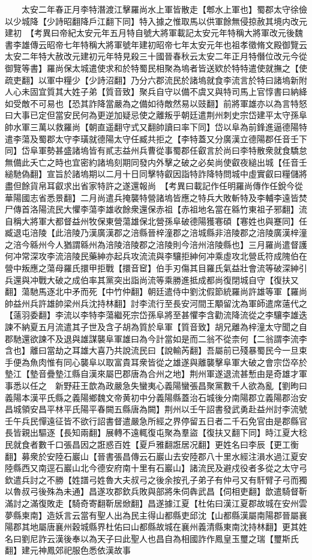 　　太安二年春正月李特潛渡江擊羅尚水上軍皆散走【郫水上軍也】蜀郡太守徐儉以少城降【少詩昭翻降戶江翻下同】特入據之惟取馬以供軍餘無侵掠赦其境内改元建初　【考異曰帝紀太安元年五月特自號大將軍載記太安元年特稱大將軍改元後魏書李雄傳云昭帝七年特稱大將軍號年建初昭帝七年太安元年也祖孝徵脩文殿御覽云太安二年特大赦改元建初元年特見殺三十國晉春秋云太安二年正月特僭位改元今從御覽等書】羅尚保太城遣使求和於特蜀民相聚為塢者皆送欵於特特遣使就撫之【使疏吏翻】以軍中糧少【少詩沼翻】乃分六郡流民於諸塢就食李流言於特曰諸塢新附人心未固宜質其大姓子弟【質音致】聚兵自守以備不虞又與特司馬上官惇書曰納絳如受敵不可易也【恐其詐降當嚴為之備如待敵然易以豉翻】前將軍雄亦以為言特怒曰大事已定但當安民何為更逆加疑忌使之離叛乎朝廷遣荆州刺史宗岱建平太守孫阜帥水軍三萬以救羅尚【朝直遥翻守式又翻帥讀曰率下同】岱以阜為前鋒進逼德陽特遣李蕩及蜀郡太守李璜就德陽太守任臧共拒之【李特蓋又分廣漢立德陽郡任音壬下同】岱阜軍勢甚盛諸塢皆有貳志益州兵曹從事蜀郡任叡言於尚曰李特散衆就食驕怠無備此夭亡之時也宜密約諸塢刻期同發内外擊之破之必矣尚使叡夜縋出城【任音壬縋馳偽翻】宣旨於諸塢期以二月十日同擊特叡因詣特詐降特問城中虛實叡曰糧儲將盡但餘貨帛耳叡求出省家特許之遂還報尚　【考異曰載記作任明羅尚傳作任銳今從華陽國志省悉景翻】二月尚遣兵掩襲特營諸塢皆應之特兵大敗斬特及李輔李遠皆焚尸傳首洛陽流民大懼李蕩李雄收餘衆還保赤祖【赤祖地名當在緜竹東祖子邪翻】流自稱大將軍大都督益州牧保東營蕩雄保北營孫阜破德陽獲寋碩【寋姓也與蹇同】任臧退屯涪陵【此涪陵乃漢廣漢郡之涪縣晉梓潼郡之涪城縣非涪陵郡之涪陵廣漢梓潼之涪今緜州今人猶謂緜州為涪陵涪陵郡之涪陵則今涪州涪陵縣也】三月羅尚遣督護何冲常深攻李流涪陵民藥紳亦起兵攻流流與李驤拒紳何冲乘虛攻北營氐符成隗伯在營中叛應之蕩母羅氏擐甲拒戰【擐音䆠】伯手刃傷其目羅氏氣益壯會流等破深紳引兵還與冲戰大破之成伯率其黨突出詣尚流等乘勝進抵成都尚復閉城自守【復扶又翻】蕩馳馬逐北中矛而死【中竹仲翻】朝廷遣侍中劉沈假節統羅尚許雄等軍【羅尚帥益州兵許雄帥梁州兵沈持林翻】討李流行至長安河間王顒留沈為軍師遣席薳代之【薳羽委翻】李流以李特李蕩繼死宗岱孫阜將至甚懼李含勸流降流從之李驤李雄迭諫不納夏五月流遣其子世及含子胡為質於阜軍【質音致】胡兄離為梓潼太守聞之自郡馳還欲諫不及退與雄謀襲阜軍雄曰為今計當如是而二翁不從柰何【二翁謂李流李含也】離曰當劫之耳雄大喜乃共說流民曰【說輸芮翻】吾屬前已殘暴蜀民今一旦束手便為魚肉惟有同心襲阜以取富貴耳衆皆從之雄遂與離襲擊阜軍大破之會宗岱卒於墊江【墊音疊墊江縣自漢來屬巴郡唐為合州之地】荆州軍遂退流甚慙由是奇雄才軍事悉以任之　新野莊王歆為政嚴急失蠻夷心義陽蠻張昌聚黨數千人欲為亂【劉昫曰義陽本漢平氏縣之義陽鄉魏文帝黄初中分義陽縣蓋治石城後分南陽郡立義陽郡治安昌城領安昌平林平氏陽平春闕五縣唐為闕】荆州以壬午詔書發武勇赴益州討李流號壬午兵民憚遠征皆不欲行詔書督遣嚴急所經之界停留五日者二千石免官由是郡縣官長皆親出驅逐【長知兩翻】展轉不遠輒復屯聚為羣盜【復扶又翻下同】時江夏大稔民就食者數千口張昌因之誑惑百姓【夏戶雅翻誑居况翻】更姓名曰李辰【更工衡翻】募衆於安陸石巖山【晉書張昌傳云石巖山去安陸郡八十里水經注溳水過江夏安陸縣西又南逕石巖山北今德安府南十里有石巖山】諸流民及避戍役者多從之太守弓欽遣兵討之不勝【姓譜弓姓魯大夫叔弓之後余按孔子弟子有仲弓又有馯臂子弓而獨以魯叔弓後殊為未通】昌遂攻郡欽兵敗與部將朱伺犇武昌【伺相吏翻】歆遣騎督靳滿討之滿復敗走【騎奇寄翻靳居焮翻】昌遂據江夏【杜佑曰漢江夏郡故城在安州雲夢縣柬南】造妖言云當有聖人出為民主得山都縣吏邱沈【山都縣漢屬南陽郡晉屬襄陽郡其地屬唐襄州穀城縣界杜佑曰山都縣故城在襄州義清縣東南沈持林翻】更其姓名曰劉尼詐云漢後奉以為天子曰此聖人也昌自為相國詐作鳳皇玉璽之瑞【璽斯氏翻】建元神鳳郊祀服色悉依漢故事